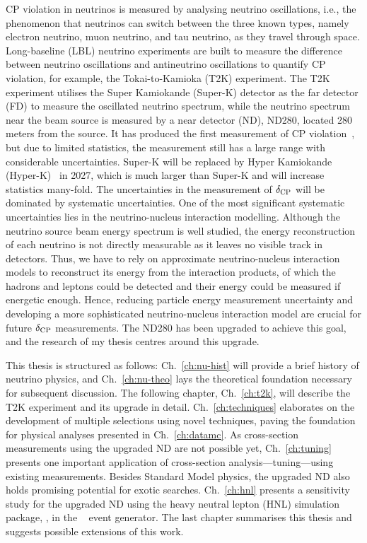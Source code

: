 CP violation in neutrinos is measured by analysing neutrino oscillations, i.e., the phenomenon that neutrinos can switch between the three known types, namely electron neutrino, muon neutrino, and tau neutrino, as they travel through space. 
Long-baseline (LBL) neutrino experiments are built to measure the difference between neutrino oscillations and antineutrino oscillations to quantify CP violation, for example, the Tokai-to-Kamioka (T2K) experiment. 
The T2K experiment utilises the Super Kamiokande (Super-K) detector as the far detector (FD) to measure the oscillated neutrino spectrum, while the neutrino spectrum near the beam source is measured by a near detector (ND), ND280, located 280 meters from the source. 
It has produced the first measurement of CP violation~\cite{T2K:2019bcf}, but due to limited statistics, the measurement still has a large range with considerable uncertainties.
Super-K will be replaced by Hyper Kamiokande (Hyper-K)~\cite{Hyper-Kamiokande:2018ofw} in 2027, which is much larger than Super-K and will increase statistics many-fold. 
The uncertainties in the measurement of $\delta_\textrm{CP}$ will be dominated by systematic uncertainties. 
One of the most significant systematic uncertainties lies in the neutrino-nucleus interaction modelling. 
Although the neutrino source beam energy spectrum is well studied, the energy reconstruction of each neutrino is not directly measurable as it leaves no visible track in detectors. 
Thus, we have to rely on approximate neutrino-nucleus interaction models to reconstruct its energy from the interaction products, of which the hadrons and leptons could be detected and their energy could be measured if energetic enough. 
Hence, reducing particle energy measurement uncertainty and developing a more sophisticated neutrino-nucleus interaction model are crucial for future $\delta_\textrm{CP}$ measurements.
The ND280 has been upgraded to achieve this goal, and the research of my thesis centres around this upgrade. 

This thesis is structured as follows: Ch.~\ref{ch:nu-hist} will provide a brief history of neutrino physics, and Ch.~\ref{ch:nu-theo} lays the theoretical foundation necessary for subsequent discussion. 
The following chapter, Ch.~\ref{ch:t2k}, will describe the T2K experiment and its upgrade in detail. 
Ch.~\ref{ch:techniques} elaborates on the development of multiple selections using novel techniques, paving the foundation for physical analyses presented in Ch.~\ref{ch:datamc}. 
As cross-section measurements using the upgraded ND are not possible yet, Ch.~\ref{ch:tuning} presents one important application of cross-section analysis—tuning—using existing measurements.
Besides Standard Model physics, the upgraded ND also holds promising potential for exotic searches.
Ch.~\ref{ch:hnl} presents a sensitivity study for the upgraded ND using the heavy neutral lepton (HNL) simulation package, , in the \genie~\cite{Andreopoulos:2015wxa} event generator.
The last chapter summarises this thesis and suggests possible extensions of this work.


